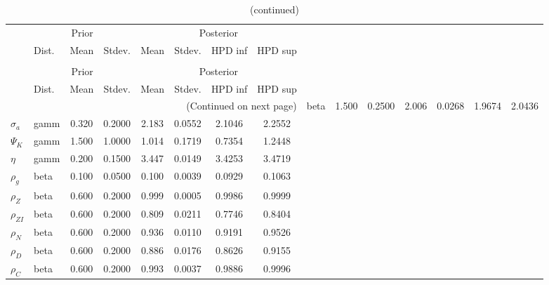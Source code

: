  
\begin{center}
\begin{longtable}{llcccccc} 
\caption{Results from Metropolis-Hastings (parameters)}
 \label{Table:MHPosterior:1}\\
\toprule 
  & \multicolumn{3}{c}{Prior}  &  \multicolumn{4}{c}{Posterior} \\
  \cmidrule(r{.75em}){2-4} \cmidrule(r{.75em}){5-8}
  & Dist. & Mean  & Stdev. & Mean & Stdev. & HPD inf & HPD sup\\
\midrule \endfirsthead 
\caption{(continued)}\\\toprule 
  & \multicolumn{3}{c}{Prior}  &  \multicolumn{4}{c}{Posterior} \\
  \cmidrule(r{.75em}){2-4} \cmidrule(r{.75em}){5-8}
  & Dist. & Mean  & Stdev. & Mean & Stdev. & HPD inf & HPD sup\\
\midrule \endhead 
\bottomrule \multicolumn{8}{r}{(Continued on next page)} \endfoot 
\bottomrule \endlastfoot 
${\gamma}$ & beta &   1.500 & 0.2500 &   2.006& 0.0268 &  1.9674 &  2.0436 \\ 
${\sigma_a}$ & gamm &   0.320 & 0.2000 &   2.183& 0.0552 &  2.1046 &  2.2552 \\ 
${\Psi_K}$ & gamm &   1.500 & 1.0000 &   1.014& 0.1719 &  0.7354 &  1.2448 \\ 
${\eta}$ & gamm &   0.200 & 0.1500 &   3.447& 0.0149 &  3.4253 &  3.4719 \\ 
${\rho_g}$ & beta &   0.100 & 0.0500 &   0.100& 0.0039 &  0.0929 &  0.1063 \\ 
${\rho_Z}$ & beta &   0.600 & 0.2000 &   0.999& 0.0005 &  0.9986 &  0.9999 \\ 
${\rho_{ZI}}$ & beta &   0.600 & 0.2000 &   0.809& 0.0211 &  0.7746 &  0.8404 \\ 
${\rho_N}$ & beta &   0.600 & 0.2000 &   0.936& 0.0110 &  0.9191 &  0.9526 \\ 
${\rho_D}$ & beta &   0.600 & 0.2000 &   0.886& 0.0176 &  0.8626 &  0.9155 \\ 
${\rho_C}$ & beta &   0.600 & 0.2000 &   0.993& 0.0037 &  0.9886 &  0.9996 \\ 
\end{longtable}
 \end{center}
